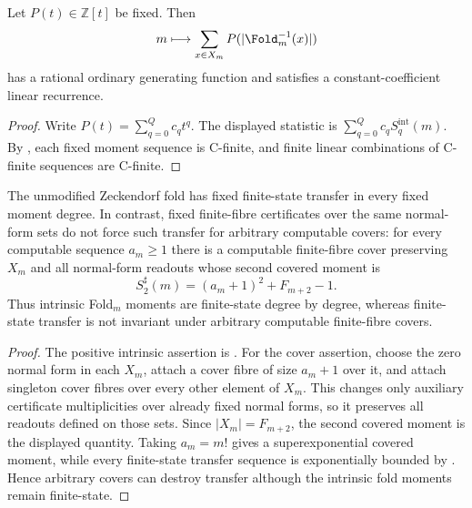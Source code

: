 \begin{corollary}
\label{cor:polynomial-intrinsic-fiber-statistics}
\label{cor:intrinsic-polynomial-statistics-cfinite}
Let \(P(t)\in\mathbb Z[t]\) be fixed.  Then
\[
  m\longmapsto \sum_{x\in X_m}P(|\Fold_m^{-1}(x)|)
\]
has a rational ordinary generating function and satisfies a constant-coefficient
linear recurrence.
\end{corollary}

\begin{proof}
Write \(P(t)=\sum_{q=0}^Q c_qt^q\).  The displayed statistic is
\(\sum_{q=0}^Q c_qS_q^{\mathrm{int}}(m)\).  By
, each fixed moment sequence is
C-finite, and finite linear combinations of C-finite sequences are C-finite.
\end{proof}

\begin{theorem}
\label{thm:intrinsic-cover-transfer-dichotomy}
\label{thm:intrinsic-versus-cover-transfer-dichotomy}
The unmodified Zeckendorf fold has fixed finite-state transfer in every fixed
moment degree.  In contrast, fixed finite-fibre certificates over the same
normal-form sets do not force such transfer for arbitrary computable covers:
for every computable sequence \(a_m\ge1\) there is a computable finite-fibre cover
preserving \(X_m\) and all normal-form readouts whose second covered moment is
\[
  S_2^\sharp(m)=(a_m+1)^2+F_{m+2}-1 .
\]
Thus intrinsic Fold\(_m\) moments are finite-state degree by degree, whereas
finite-state transfer is not invariant under arbitrary computable finite-fibre
covers.
\end{theorem}

\begin{proof}
The positive intrinsic assertion is .
For the cover assertion, choose the zero normal form in each \(X_m\), attach a
cover fibre of size \(a_m+1\) over it, and attach singleton cover fibres over
every other element of \(X_m\).  This changes only auxiliary certificate
multiplicities over already fixed normal forms, so it preserves all readouts
defined on those sets.  Since \(|X_m|=F_{m+2}\), the second covered moment is the
displayed quantity.  Taking \(a_m=m!\) gives a superexponential covered moment,
while every finite-state transfer sequence is exponentially bounded by
.  Hence arbitrary covers can destroy
transfer although the intrinsic fold moments remain finite-state.
\end{proof}


